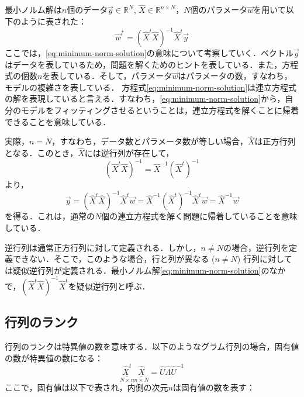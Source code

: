 \section{}
最小ノルム解は$n$個のデータ$\vec{y}\in\mathbb{R}^{N}$, $\hat{X}\in\mathbb{R}^{n\times N}$，$N$個のパラメータ$\vec{w}$を用いて以下のように表された：
\begin{equation}\label{eq:minimum-norm-solution}
    \vec{w}^\ast = (\hat{X}^t\hat{X})^{-1}
    \hat{X}^t\vec{y}
\end{equation}
ここでは，\eqref{eq:minimum-norm-solution}の意味について考察していく．ベクトル$\vec{y}$はデータを表しているため，問題を解くためのヒントを表している．また，方程式の個数$n$を表している．そして，パラメータ$\vec{w}$はパラメータの数，すなわち，モデルの複雑さを表している．
方程式\eqref{eq:minimum-norm-solution}は連立方程式の解を表現していると言える．すなわち，\eqref{eq:minimum-norm-solution}から，自分のモデルをフィッティングさせるということは，連立方程式を解くことに帰着できることを意味している．

実際，$n=N$，すなわち，データ数とパラメータ数が等しい場合，$\hat{X}$は正方行列となる．このとき，$\hat{X}$には逆行列が存在して，
\begin{equation}
    (\hat{X}^t\hat{X})^{-1} = \hat{X}^{-1}(\hat{X}^t)^{-1}
\end{equation}
より，
\begin{equation}
    \vec{y} = (\hat{X}^t\hat{X})^{-1}\hat{X}^t\vec{w} = \hat{X}^{-1}(\hat{X}^t)^{-1}\hat{X}^t\vec{w} = \hat{X}^{-1}\vec{w}
\end{equation}
を得る．これは，通常の$N$個の連立方程式を解く問題に帰着していることを意味している．

逆行列は通常正方行列に対して定義される．しかし，$n\neq N$の場合，逆行列を定義できない．そこで，このような場合，行と列が異なる ($n\neq N$) 行列に対しては疑似逆行列が定義される．最小ノルム解\eqref{eq:minimum-norm-solution}のなかで，$(\hat{X}^t\hat{X})^{-1}
\hat{X}^t$を疑似逆行列と呼ぶ．

\subsection{行列のランク}
行列のランクは特異値の数を意味する．以下のようなグラム行列の場合，固有値の数が特異値の数になる：
\begin{equation}
    {\underset{N\times n}{\underline{\hat{X}^t}}}
    {\underset{n\times N}{\underline{\hat{X}}}} = \hat{U}\hat{\Lambda}\hat{U}^{-1}
\end{equation}
ここで，固有値は以下で表され，内側の次元$n$は固有値の数を表す：

